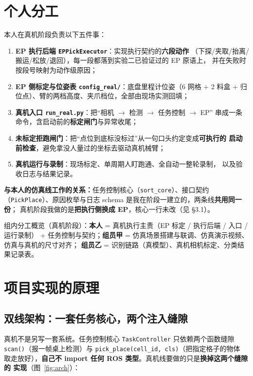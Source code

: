 \documentclass[12pt,a4paper]{ctexart}
\begin{document}
\section{个人分工}

本人在真机阶段负责以下五件事：

\begin{enumerate}[leftmargin=1.8em]
  \item \textbf{EP 执行后端 \texttt{EPPickExecutor}}：实现执行契约的\textbf{六段动作}
        （下探/夹取/抬离/搬运/松放/退回），每一段都落到实验二已验证过的 EP 原语上，
        并在失败时按段号映射为动作级原因；
  \item \textbf{EP 侧标定与位姿表 \texttt{config\_real/}}：底盘里程计位姿（6 网格 + 2 料盒 +
        归位点）、臂的两档高度、夹爪档位，全部由现场实测回填；
  \item \textbf{真机入口 \texttt{run\_real.py}}：把“相机 $\to$ 检测 $\to$ 任务控制 $\to$ EP”
        串成一条命令，含启动前的\textbf{标定闸门}与异常收尾；
  \item \textbf{未标定拒跑闸门}：把“点位到底标没标过”从一句口头约定变成\textbf{可执行的
        启动前检查}，避免拿没人量过的坐标去驱动真机械臂；
  \item \textbf{真机运行与录制}：现场标定、单周期人盯跑通、全自动一整轮录制，
        以及验收日志与结果记录。
\end{enumerate}

\textbf{与本人的仿真线工作的关系：}任务控制核心（\texttt{sort\_core}）、接口契约
（\texttt{PickPlace}）、原因枚举与日志 schema 是我在阶段一建立的，两条线\textbf{共用同一份}；
真机阶段我做的是\textbf{把执行侧换成 EP}，核心一行未改（见 §3.1）。

组内分工概览（真机阶段）：\textbf{本人} = 真机执行主责（EP 标定 / 执行后端 / 入口 / 运行录制）
+ 任务控制与契约；\textbf{组员甲} = 仿真场景搭建与联调、仿真演示视频、仿真与真机的尺寸对齐；
\textbf{组员乙} = 识别链路（真模型）、真机相机标定、分类结果记录表。

\section{项目实现的原理}

\subsection{双线架构：一套任务核心，两个注入缝隙}

真机不是另写一套系统。任务控制核心 \texttt{TaskController} 只依赖两个函数缝隙
\texttt{scan()}（报一帧桌上检测）与 \texttt{pick\_place(cell\_id, cls)}（把指定格子的物体
取走放好），\textbf{自己不 import 任何 ROS 类型}。真机线要做的只是\textbf{换掉这两个缝隙的
实现}（图~\ref{fig:arch}）：
\end{document}
